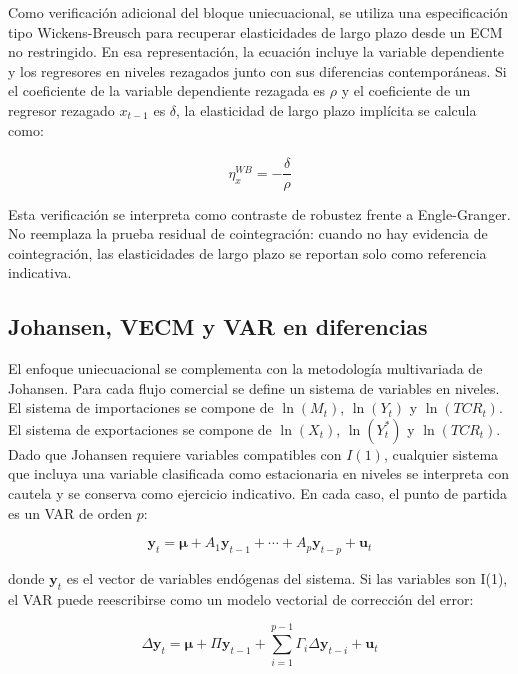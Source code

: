 \documentclass[11pt,a4paper]{article}
\begin{document}
	Como verificación adicional del bloque uniecuacional, se utiliza una
	especificación tipo Wickens-Breusch para recuperar elasticidades de largo plazo
	desde un ECM no restringido. En esa representación, la ecuación incluye la
	variable dependiente y los regresores en niveles rezagados junto con sus
	diferencias contemporáneas. Si el coeficiente de la variable dependiente
	rezagada es \(\rho\) y el coeficiente de un regresor rezagado \(x_{t-1}\) es
	\(\delta\), la elasticidad de largo plazo implícita se calcula como:

	\begin{equation}
		\eta_x^{WB} = -\frac{\widehat{\delta}}{\widehat{\rho}}
		\label{eq:wickens-breusch-elasticidad}
	\end{equation}

	Esta verificación se interpreta como contraste de robustez frente a
	Engle-Granger. No reemplaza la prueba residual de cointegración: cuando no hay
	evidencia de cointegración, las elasticidades de largo plazo se reportan solo
	como referencia indicativa.

	\subsection{Johansen, VECM y VAR en diferencias}
	\label{subsec:metodologia-johansen-var}

	El enfoque uniecuacional se complementa con la metodología multivariada de
	Johansen. Para cada flujo comercial se define un sistema de variables en
	niveles. El sistema de importaciones se compone de
	\(\ln(M_t)\), \(\ln(Y_t)\) y \(\ln(TCR_t)\). El sistema de exportaciones se
	compone de \(\ln(X_t)\), \(\ln(Y_t^*)\) y \(\ln(TCR_t)\). Dado que Johansen
	requiere variables compatibles con \(I(1)\), cualquier sistema que incluya una
	variable clasificada como estacionaria en niveles se interpreta con cautela y se
	conserva como ejercicio indicativo. En cada caso, el punto de partida es un VAR
	de orden \(p\):

	\begin{equation}
		\mathbf{y}_t
		= \boldsymbol{\mu}
		+ A_1\mathbf{y}_{t-1}
		+ \cdots
		+ A_p\mathbf{y}_{t-p}
		+ \mathbf{u}_t
		\label{eq:tp3-var-niveles}
	\end{equation}

	donde \(\mathbf{y}_t\) es el vector de variables endógenas del sistema. Si las
	variables son I(1), el VAR puede reescribirse como un modelo vectorial de
	corrección del error:

	\begin{equation}
		\Delta \mathbf{y}_t
		= \boldsymbol{\mu}
		+ \Pi \mathbf{y}_{t-1}
		+ \sum_{i=1}^{p-1}\Gamma_i \Delta \mathbf{y}_{t-i}
		+ \mathbf{u}_t
		\label{eq:tp3-vec-pi}
	\end{equation}
\end{document}
